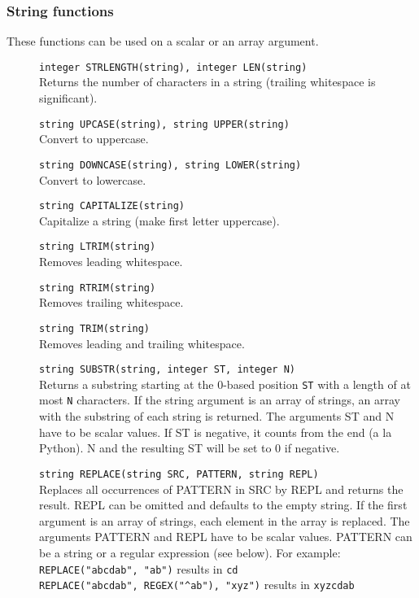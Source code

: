 \subsubsection{String functions}
These functions can be used on a scalar or an array argument.
\begin{description}
  \item[] \texttt{integer STRLENGTH(string),  integer LEN(string)}\\
    Returns the number of characters in a string
    (trailing whitespace is significant).
  \item[] \texttt{string UPCASE(string), string UPPER(string) }\\
    Convert to uppercase.
  \item[] \texttt{string DOWNCASE(string),  string LOWER(string)}\\
    Convert to lowercase.
  \item[] \texttt{string CAPITALIZE(string)}\\
    Capitalize a string (make first letter uppercase).
  \item[] \texttt{string LTRIM(string)}\\
    Removes leading whitespace.
  \item[] \texttt{string RTRIM(string)}\\
    Removes trailing whitespace.
  \item[] \texttt{string TRIM(string)}\\
    Removes leading and trailing whitespace.
  \item[] \texttt{string SUBSTR(string, integer ST, integer N)}\\
    Returns a substring starting at the 0-based position
    \texttt{ST} with a length of at most \texttt{N} characters.
   If the string argument is an array of strings, an array with the substring of each
   string is returned. The arguments ST and N have to be scalar
   values. If ST is negative, it counts from the end (a la Python).
   N and the resulting ST will be set to 0 if negative.
  \item[] \texttt{string REPLACE(string SRC, PATTERN, string REPL)}\\
   Replaces all occurrences of PATTERN in SRC by REPL and returns the
   result. REPL can be omitted and defaults to the empty string.
   If the first argument is an array of strings, each element in the
   array is replaced.
   The arguments PATTERN and REPL have to be scalar values. PATTERN
   can be a string or a regular expression (see below). For example:
   \\\verb+REPLACE("abcdab", "ab")+ results in \texttt{cd}
   \\\verb+REPLACE("abcdab", REGEX("^ab"), "xyz")+ results in \texttt{xyzcdab}
\end{description}

